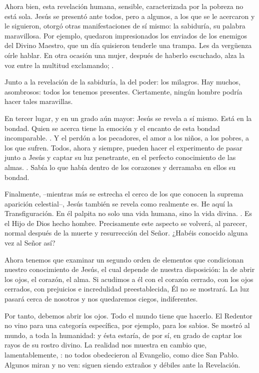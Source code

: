 \begin{body}
Ahora bien, esta revelación humana, sensible, caracterizada por la pobreza no está sola. Jesús se presentó ante todos, pero a algunos, a los que se le acercaron y le siguieron, otorgó otras manifestaciones de sí mismo: la sabiduría, su palabra maravillosa. Por ejemplo, quedaron impresionados los enviados de los enemigos del Divino Maestro, que un día quisieron tenderle una trampa. Les da vergüenza oírle hablar. En otra ocasión una mujer, después de haberlo escuchado, alza la voz entre la multitud exclamando; .

Junto a la revelación de la sabiduría, la del poder: los milagros. Hay muchos, asombrosos: todos los tenemos presentes. Ciertamente, ningún hombre podría hacer tales maravillas.

En tercer lugar, y en un grado aún mayor: Jesús se revela a sí mismo. Está en la bondad. Quien se acerca tiene la emoción y el encanto de esta bondad incomparable. . Y el perdón a los pecadores, el amor a los niños, a los pobres, a los que sufren. Todos, ahora y siempre, pueden hacer el experimento de pasar junto a Jesús y captar su luz penetrante, en el perfecto conocimiento de las almas. . Sabía lo que había dentro de los corazones y derramaba en ellos su bondad.

Finalmente, –mientras más se estrecha el cerco de los que conocen la suprema aparición celestial–, Jesús también se revela como realmente es. He aquí la Transfiguración. En él palpita no solo una vida humana, sino la vida divina. . Es el Hijo de Dios hecho hombre. Precisamente este aspecto se volverá, al parecer, normal después de la muerte y resurrección del Señor. ¿Habéis conocido alguna vez al Señor así?


Ahora tenemos que examinar un segundo orden de elementos que condicionan nuestro conocimiento de Jesús, el cual depende de nuestra disposición: la de abrir los ojos, el corazón, el alma. Si acudimos a él con el corazón cerrado, con los ojos cerrados, con prejuicios e incredulidad preestablecida, Él no se mostrará. La luz pasará cerca de nosotros y nos quedaremos ciegos, indiferentes.

Por tanto, debemos abrir los ojos. Todo el mundo tiene que hacerlo. El Redentor no vino para una categoría específica, por ejemplo, para los sabios. Se mostró al mundo, a toda la humanidad: y ésta estaría, de por sí, en grado de captar los rayos de su rostro divino. La realidad nos muestra en cambio que, lamentablemente, : no todos obedecieron al Evangelio, como dice San Pablo. Algunos miran y no ven: siguen siendo extraños y débiles ante la Revelación.


\end{body}
